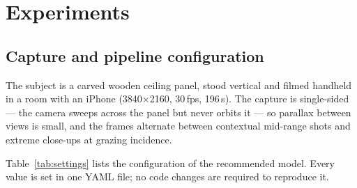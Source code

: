 %

\section{Experiments}
\label{sec:experiments}

\subsection{Capture and pipeline configuration}
\label{sec:setup}

The subject is a carved wooden ceiling panel, stood vertical and filmed handheld in
a room with an iPhone (3840$\times$2160, 30\,fps, 196\,s). The capture is
single-sided --- the camera sweeps across the panel but never orbits it --- so
parallax between views is small, and the frames alternate between contextual
mid-range shots and extreme close-ups at grazing incidence.

Table~\ref{tab:settings} lists the configuration of the recommended model. Every
value is set in one YAML file; no code changes are required to reproduce it.

